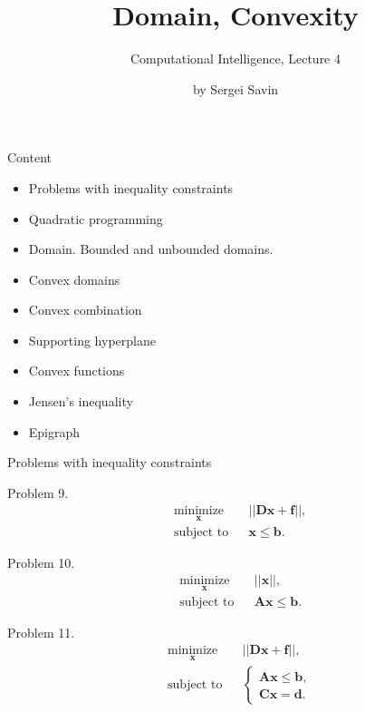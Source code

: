 \documentclass{beamer}
\title{Domain, Convexity}
\subtitle{Computational Intelligence, Lecture 4}
\author{by Sergei Savin}
\date{\mydate}
\begin{document}
\maketitle


\begin{frame}{Content}

\begin{itemize}
\item Problems with inequality constraints
\item Quadratic programming
\item Domain. Bounded and unbounded domains.
\item Convex domains
\item Convex combination
\item Supporting hyperplane
\item Convex functions
\item Jensen’s inequality
\item Epigraph
\end{itemize}

\end{frame}




\begin{frame}{Problems with inequality constraints}
\begin{flushleft}

Problem 9. 
%
\begin{equation}
\begin{aligned}
& \underset{\mathbf{x}}{\text{minimize}}
& & || \mathbf{D}\mathbf{x} + \mathbf{f} ||, \\
& \text{subject to}
& & \mathbf{x} \leq \mathbf{b}.
\end{aligned}
\end{equation}

Problem 10. 
%
\begin{equation}
\begin{aligned}
& \underset{\mathbf{x}}{\text{minimize}}
& & || \mathbf{x} ||, \\
& \text{subject to}
& & \mathbf{A}\mathbf{x} \leq \mathbf{b}.
\end{aligned}
\end{equation}

Problem 11. 
%
\begin{equation}
\begin{aligned}
& \underset{\mathbf{x}}{\text{minimize}}
& & || \mathbf{D}\mathbf{x} + \mathbf{f} ||, \\
& \text{subject to}
& & \begin{cases}
    \mathbf{A}\mathbf{x} \leq \mathbf{b}, \\
    \mathbf{C}\mathbf{x} = \mathbf{d}.
    \end{cases}
\end{aligned}
\end{equation}

\end{flushleft}
\end{frame}
\end{document}
